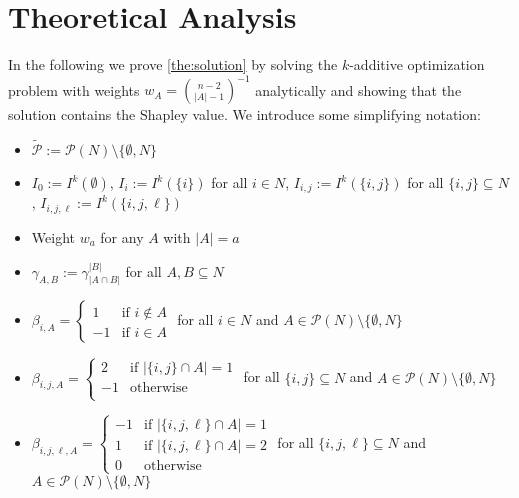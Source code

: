 \section{Theoretical Analysis} \label{app:analysis}

In the following we prove \cref{the:solution}
by solving the $k$-additive optimization problem with weights $w_A = \binom{n-2}{|A|-1}^{-1}$ analytically and showing that the solution contains the Shapley value.
We introduce some simplifying notation:
\begin{itemize}
    \item $\tilde{\mathcal{P}} := \mathcal{P}(N) \setminus \{\emptyset,N\}$
    \item $I_0 := I^k(\emptyset)$, \hspace{0.1cm} $I_i := I^k(\{i\})$ for all $i \in N$, \hspace{0.1cm} $I_{i,j} := I^k(\{i,j\})$ for all $\{i,j\} \subseteq N$, \hspace{0.1cm} $I_{i,j,\ell} := I^k(\{i,j,\ell\})$
    \item Weight $w_a$ for any $A$ with $|A|=a$
    \item $\gamma_{A,B} := \gamma_{\left| A \cap B \right|}^{\left|B \right|}$ for all $A,B \subseteq N$
    \item $\beta_{i,A} = \begin{cases}
        1 & \text{if } i \notin A \\
        -1 & \text{if } i \in A
    \end{cases}$ \quad for all $i \in N$ and $A \in \mathcal{P}(N) \setminus \{\emptyset,N\}$
    \item $\beta_{i,j,A} = \begin{cases}
        2 & \text{if } |\{i,j\} \cap A| = 1 \\
        - 1 & \text{otherwise} \\
    \end{cases}$ \quad for all $\{i,j\} \subseteq N$ and $A \in \mathcal{P}(N) \setminus \{\emptyset,N\}$
    \item $\beta_{i,j,\ell,A} = \begin{cases}
        - 1 & \text{if } |\{i,j,\ell\} \cap A| = 1 \\
        1 & \text{if } |\{i,j,\ell\} \cap A| = 2 \\
        0 & \text{otherwise}
    \end{cases}$ \quad for all $\{i,j,\ell\} \subseteq N $ and $A \in \mathcal{P}(N) \setminus \{\emptyset,N\}$
\end{itemize}

